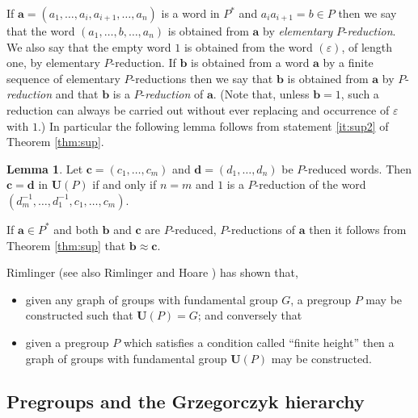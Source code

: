 \documentclass[a4paper]{article}
\newcommand\eps{\varepsilon}
\newcommand{\avec}{\mathbf{a}}	%
\newcommand{\bvec}{\mathbf{b}}	%
\newcommand{\cvec}{\mathbf{c}}	%
\newcommand{\dvec}{\mathbf{d}}	%
\newcommand{\Uvec}{\mathbf{U}}	%
\newcommand{\UP}{\Uvec(P)}
\theoremstyle{plain}
\theoremstyle{definition}
\newtheorem{lemma}[theorem]{Lemma}
\begin{document}
If $\avec=(a_1,\ldots, a_i,a_{i+1},\ldots, a_n)$ is a word in $P^*$ and $a_ia_{i+1}=b\in P$ then
we say that the word  $(a_1,\ldots, b ,\ldots, a_n)$ is obtained from $\avec$ by
\emph{elementary} $P$-\emph{reduction}. We also say that the empty word $1$ is obtained from the 
word $(\eps)$, of length one, by elementary $P$-reduction. If $\bvec$ is obtained from a word $\avec$
 by a finite sequence of elementary $P$-reductions then we say that $\bvec$ is obtained from $\avec$
by $P$-\emph{reduction} and that $\bvec$ is a $P$-\emph{reduction} of $\avec$.  
(Note that, unless $\bvec=1$,  such a reduction can always be carried out without ever
replacing and occurrence of $\eps$ with $1$.) 
In particular the following lemma follows from statement \ref{it:sup2} of Theorem \ref{thm:sup}.
\begin{lemma}\label{lem:interleave}
Let $\cvec=(c_1,\ldots , c_m)$ and $\dvec=(d_1,\ldots, d_n)$ be $P$-reduced words. Then 
$\cvec=\dvec$ in $\UP$  if and only if $n=m$ and $1$ is a $P$-reduction of the word
$(d_m^{-1},\ldots, d_1^{-1},c_1,\ldots , c_m)$. 
\end{lemma}

If $\avec \in P^\ast$ and both $\bvec$ and $\cvec$ are $P$-reduced, $P$-reductions of $\avec$ then
it follows from Theorem \ref{thm:sup} that $\bvec\approx \cvec$. 

Rimlinger \cite{Rimlinger_1987a} (see also Rimlinger \cite{Rimlinger_1987b} and Hoare \cite{Hoare_1988}) 
has shown that, 
\begin{itemize}
\item given any graph of groups with fundamental group $G$, a pregroup $P$ may
be constructed such that $\UP = G$;  and conversely that
\item  given a pregroup $P$ which satisfies a condition called ``finite height'' then a graph
of groups with fundamental group $\UP$ may be constructed.
\end{itemize}



\subsection{Pregroups and the Grzegorczyk hierarchy}
\end{document}
